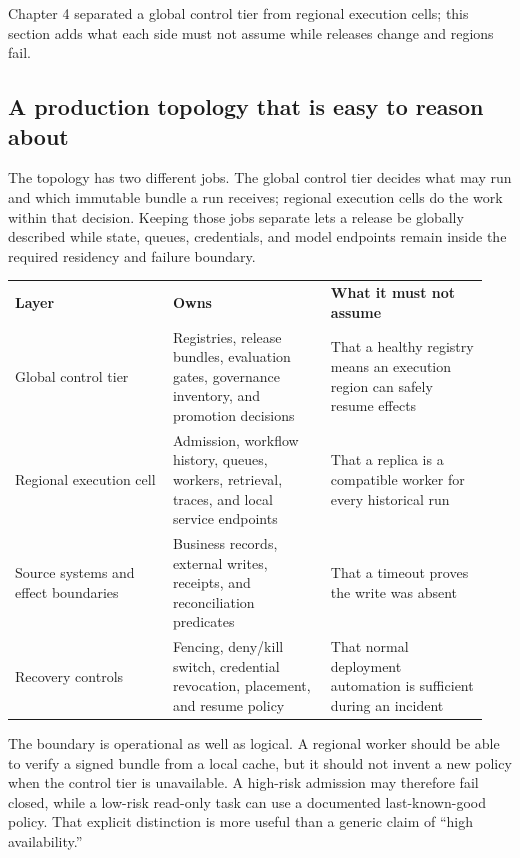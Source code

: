 Chapter 4 separated a global control tier from regional execution cells; this section adds what each side must not assume while releases change and regions fail.\par

\subsection{A production topology that is easy to reason about}

The topology has two different jobs. The global control tier decides what may run and which immutable bundle a run receives; regional execution cells do the work within that decision. Keeping those jobs separate lets a release be globally described while state, queues, credentials, and model endpoints remain inside the required residency and failure boundary.\par

\BookTableStart
\small
\begin{tabular}{@{}Y{0.3133\linewidth}Y{0.3133\linewidth}Y{0.3133\linewidth}@{}}
\color{white}\bfseries \textbf{Layer} & \color{white}\bfseries \textbf{Owns} & \color{white}\bfseries \textbf{What it must not assume} \\
Global control tier & Registries, release bundles, evaluation gates, governance inventory, and promotion decisions & That a healthy registry means an execution region can safely resume effects \\
Regional execution cell & Admission, workflow history, queues, workers, retrieval, traces, and local service endpoints & That a replica is a compatible worker for every historical run \\
Source systems and effect boundaries & Business records, external writes, receipts, and reconciliation predicates & That a timeout proves the write was absent \\
Recovery controls & Fencing, deny/kill switch, credential revocation, placement, and resume policy & That normal deployment automation is sufficient during an incident \\
\end{tabular}
\BookTableEnd

The boundary is operational as well as logical. A regional worker should be able to verify a signed bundle from a local cache, but it should not invent a new policy when the control tier is unavailable. A high-risk admission may therefore fail closed, while a low-risk read-only task can use a documented last-known-good policy. That explicit distinction is more useful than a generic claim of “high availability.”\par


